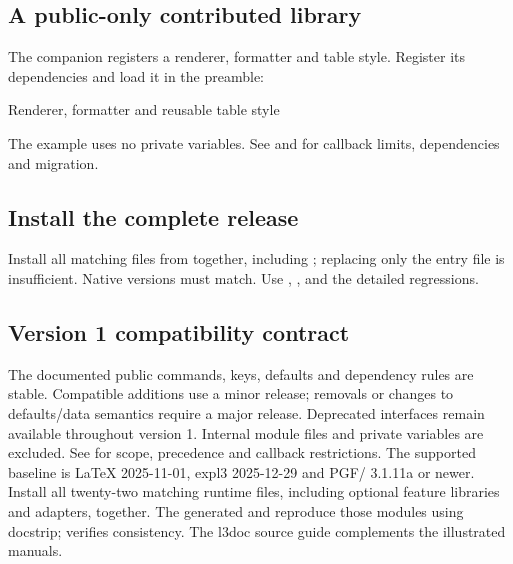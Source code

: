 \subsection{A public-only contributed library}
The companion  registers a renderer,
formatter and table style. Register its dependencies and load it in the preamble:
\begin{source}
\end{source}
\begin{demo}{Renderer, formatter and reusable table style}
\par
{}\par
\begin{center}
\begin{gradtable}[align=c,header align=c,style=demo-report,width=\linewidth]
\end{gradtable}
\end{center}
\end{demo}
The example uses no private variables. See  and
 for callback limits, dependencies and migration.
\subsection{Install the complete release}
Install all matching
 files from  together, including ; replacing only the entry file is insufficient.
Native versions must match. Use ,
,  and the detailed
 regressions.
\subsection{Version 1 compatibility contract}
The documented public commands, keys, defaults and dependency rules are stable.
Compatible additions use a minor release; removals or changes to defaults/data
semantics require a major release. Deprecated interfaces remain available
throughout version 1. Internal module files and private variables are excluded.
See  for scope, precedence and callback restrictions.
The supported baseline is LaTeX 2025-11-01, expl3 2025-12-29 and PGF/\manualTikZ{}
3.1.11a or newer. Install all twenty-two matching runtime files, including optional feature libraries and adapters, together.
The generated  and  reproduce those modules
using docstrip;  verifies consistency.
The l3doc source guide complements the illustrated manuals.
